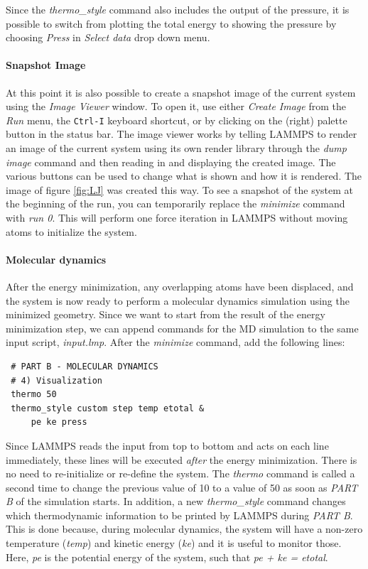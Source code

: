 \documentclass[9pt,tutorial]{livecoms}
\begin{document}
Since the \textit{thermo\_style} command also includes the output of the
pressure, it is possible to switch from plotting the total energy to
showing the pressure by choosing \textit{Press} in \textit{Select data}
drop down menu.

\paragraph{Snapshot Image}

At this point it is also possible to create a snapshot image of the
current system using the \textit{Image Viewer} window.  To open it, use
either \textit{Create Image} from the \textit{Run} menu, the
\texttt{Ctrl-I} keyboard shortcut, or by clicking on the (right) palette
button in the status bar.  The image viewer works by telling LAMMPS to
render an image of the current system using its own render library
through the \textit{dump image} command and then reading in and
displaying the created image.  The various buttons can be used to change
what is shown and how it is rendered.  The image of figure \ref{fig:LJ}
was created this way.  To see a snapshot of the system at the beginning
of the run, you can temporarily replace the \textit{minimize} command
with \textit{run 0}.  This will perform one force iteration in LAMMPS without
moving atoms to initialize the system.

\paragraph{Molecular dynamics}

After the energy minimization, any overlapping atoms have been displaced,
and the system is now ready to perform a molecular dynamics simulation
using the minimized geometry.  Since we want to start from the result of
the energy minimization step, we can append commands for the MD simulation
to the same input script, \textit{input.lmp}. After the
\textit{minimize} command, add the following lines:
{\normalsize
\begin{verbatim}
 # PART B - MOLECULAR DYNAMICS
 # 4) Visualization
 thermo 50
 thermo_style custom step temp etotal &
     pe ke press
\end{verbatim}
}

Since LAMMPS reads the input from top to bottom and acts on each line
immediately, these lines will be executed \emph{after} the energy
minimization.  There is no need to re-initialize or re-define the
system.  The \textit{thermo} command is called a second time to change
the previous value of 10 to a value of 50 as soon as \textit{PART B} of
the simulation starts.  In addition, a new \textit{thermo\_style}
command changes which thermodynamic information to be printed by LAMMPS
during \textit{PART B}.  This is done because, during molecular
dynamics, the system will have a non-zero temperature (\textit{temp})
and kinetic energy (\textit{ke}) and it is useful to monitor those.
Here, \textit{pe} is the potential energy of the system, such that
\textit{pe + ke = etotal}.
\end{document}
